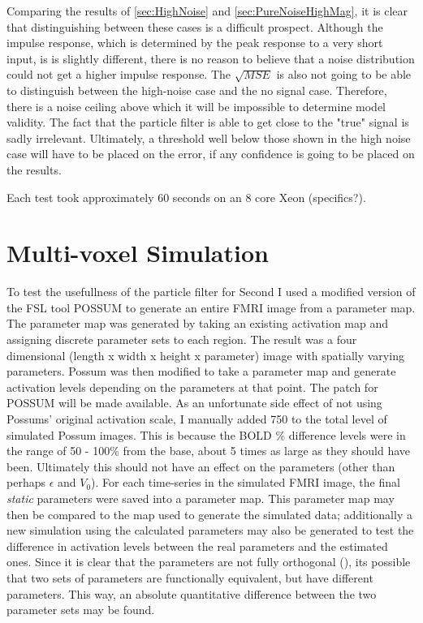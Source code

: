 Comparing the results of \autoref{sec:HighNoise} and \autoref{sec:PureNoiseHighMag}, it is
clear that distinguishing between these cases is a difficult prospect. Although
the impulse response, which is determined by the peak response to a very short input,
is is slightly different, there is no reason to believe that a noise distribution
could not get a higher impulse response. The $\sqrt{MSE}$ is also not going to be
able to distinguish between the high-noise case and the no signal case. Therefore, there
is a noise ceiling above which it will be impossible to determine model validity. The fact
that the particle filter is able to get close to the "true" signal is sadly irrelevant.
Ultimately, a threshold well below those shown in the high noise case 
will have to be placed on the error, if any confidence is going to be placed on the results.

Each test took approximately 60 seconds on an 8 core Xeon (specifics?).

\section{Multi-voxel Simulation}
To test the usefullness of the particle filter for Second I used a modified version of the FSL tool 
POSSUM to generate an entire FMRI image from a parameter map. The parameter map was generated
by taking an existing activation map and assigning discrete parameter sets to each region.
The result was a four dimensional (length x width
x height x parameter) image with spatially varying parameters. Possum was then modified
to take a parameter map and generate activation levels depending on the parameters at that
point. The patch for POSSUM will be made available. As an unfortunate side effect of 
not using Possums' original activation scale, I manually added 750 to the total level of
simulated Possum images. This is because the BOLD \% difference levels were in the range
of 50 - 100\% from the base, about 5 times as large as they should have been. Ultimately
this should not have an effect on the parameters (other than perhaps $\epsilon$ and $V_0$). 
For each time-series in the simulated FMRI image, the final \emph{static} parameters were saved
into a parameter map. This parameter map may then be compared to the map used to generate the 
simulated data; additionally a new simulation using the calculated parameters may also be 
generated to test the difference in activation levels between the real parameters and the
estimated ones. Since it is clear that the parameters are not fully orthogonal 
(\cite{Deneux2006}), its possible that two sets of parameters are functionally equivalent,
but have different parameters. This way, an absolute 
quantitative difference between the two parameter sets may be found.

